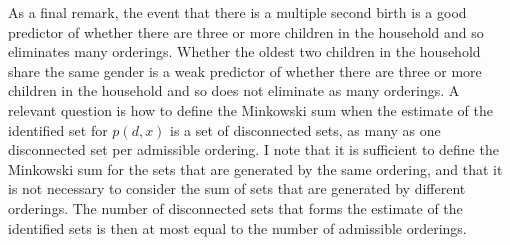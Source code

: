 \documentclass[12pt,a4paper,twoside]{article}
\numberwithin{equation}{section}
\begin{document}
As a final remark, the event that there is a multiple second birth is a good predictor of whether there are three or more children in the household and so eliminates many orderings. Whether the oldest two children in the household share the same gender is a weak predictor of whether there are three or more children in the household and so does not eliminate as many orderings. A relevant question is how to define the Minkowski sum when the estimate of the identified set for $p(d,x)$ is a set of disconnected sets, as many as one disconnected set per admissible ordering. I note that it is sufficient to define the Minkowski sum for the sets that are generated by the same ordering, and that it is not necessary to consider the sum of sets that are generated by different orderings. The number of disconnected sets that forms the estimate of the identified sets is then at most equal to the number of admissible orderings.
\end{document}
